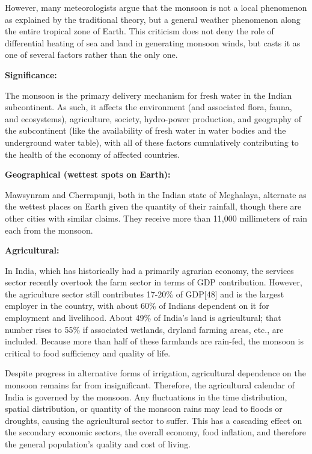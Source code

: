 \documentclass[12pt,openany]{book}
\begin{document}
However, many meteorologists argue that the monsoon is not a local phenomenon as explained by the traditional theory, but a general weather phenomenon along the entire tropical zone of Earth. This criticism does not deny the role of differential heating of sea and land in generating monsoon winds, but casts it as one of several factors rather than the only one.

\textbf{Significance:}

The monsoon is the primary delivery mechanism for fresh water in the Indian subcontinent. As such, it affects the environment (and associated flora, fauna, and ecosystems), agriculture, society, hydro-power production, and geography of the subcontinent (like the availability of fresh water in water bodies and the underground water table), with all of these factors cumulatively contributing to the health of the economy of affected countries.

\textbf{Geographical (wettest spots on Earth):}

Mawsynram and Cherrapunji, both in the Indian state of Meghalaya, alternate as the wettest places on Earth given the quantity of their rainfall, though there are other cities with similar claims. They receive more than 11,000 millimeters of rain each from the monsoon.

\textbf{Agricultural:}

In India, which has historically had a primarily agrarian economy, the services sector recently overtook the farm sector in terms of GDP contribution. However, the agriculture sector still contributes 17-20\% of GDP{[}48{]} and is the largest employer in the country, with about 60\% of Indians dependent on it for employment and livelihood. About 49\% of India's land is agricultural; that number rises to 55\% if associated wetlands, dryland farming areas, etc., are included. Because more than half of these farmlands are rain-fed, the monsoon is critical to food sufficiency and quality of life.

Despite progress in alternative forms of irrigation, agricultural dependence on the monsoon remains far from insignificant. Therefore, the agricultural calendar of India is governed by the monsoon. Any fluctuations in the time distribution, spatial distribution, or quantity of the monsoon rains may lead to floods or droughts, causing the agricultural sector to suffer. This has a cascading effect on the secondary economic sectors, the overall economy, food inflation, and therefore the general population's quality and cost of living.
\end{document}
